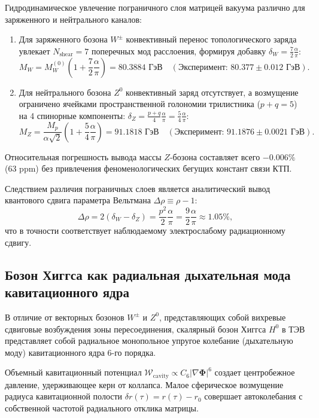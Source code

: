 \documentclass[11pt,a4paper]{article}
\theoremstyle{definition}
\theoremstyle{remark}
\begin{document}
Гидродинамическое увлечение пограничного слоя матрицей вакуума различно для 
заряженного и нейтрального каналов:
\begin{enumerate}
	\item Для заряженного бозона $W^\pm$ конвективный перенос топологического заряда 
	увлекает $N_{\text{shear}} = 7$ поперечных мод расслоения, формируя добавку 
	$\delta_W = \frac{7}{2}\frac{\alpha}{\pi}$:
	\begin{equation}
		M_W = M_W^{(0)} \left( 1 + \frac{7}{2}\frac{\alpha}{\pi} \right) = \mathbf{80.3884\text{ ГэВ}} 
		\quad (\text{Эксперимент: } 80.377 \pm 0.012\text{ ГэВ}).
	\end{equation}
	\item Для нейтрального бозона $Z^0$ конвективный заряд отсутствует, а возмущение 
	ограничено ячейками пространственной голономии трилистника ($p+q = 5$) на 4 спинорные 
	компоненты: $\delta_Z = \frac{p+q}{4}\frac{\alpha}{\pi} = \frac{5}{4}\frac{\alpha}{\pi}$:
	\begin{equation}
		M_Z = \frac{M_p}{\alpha\sqrt{2}} \left( 1 + \frac{5}{4}\frac{\alpha}{\pi} \right) = \mathbf{91.1818\text{ ГэВ}} 
		\quad (\text{Эксперимент: } 91.1876 \pm 0.0021\text{ ГэВ}).
	\end{equation}
\end{enumerate}
Относительная погрешность вывода массы $Z$-бозона составляет всего $-0.006\%$ (63 ppm) 
без привлечения феноменологических бегущих констант связи КТП.

Следствием различия пограничных слоев является аналитический вывод квантового сдвига 
параметра Вельтмана $\Delta\rho \equiv \rho - 1$:
\begin{equation}
	\Delta\rho = 2(\delta_W - \delta_Z) = \frac{p^2}{2}\frac{\alpha}{\pi} = \frac{9}{2}\frac{\alpha}{\pi} \approx \mathbf{1.05\%},
\end{equation}
что в точности соответствует наблюдаемому электрослабому радиационному сдвигу.

\subsection{Бозон Хиггса как радиальная дыхательная мода кавитационного ядра}
В отличие от векторных бозонов $W^\pm$ и $Z^0$, представляющих собой вихревые сдвиговые возбуждения зоны пересоединения, скалярный бозон Хиггса $H^0$ в ТЭВ представляет собой радиальное монопольное упругое колебание (дыхательную моду) кавитационного ядра 6-го порядка.

Объемный кавитационный потенциал $\mathcal{W}_{\mathrm{cavity}} \propto C_6 |\nabla \boldsymbol{\Phi}|^6$ создает центробежное давление, удерживающее керн от коллапса. Малое сферическое возмущение радиуса кавитационной полости $\delta r(\tau) = r(\tau) - r_0$ совершает автоколебания с собственной частотой радиального отклика матрицы.
\end{document}
